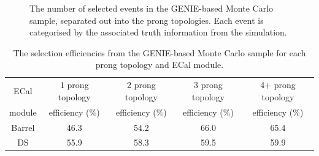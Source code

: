 \begin{figure}
  \centering
  \hspace{1em}
  \caption{The number of selected events in the GENIE-based Monte Carlo sample, separated out into the prong topologies.  Each event is categorised by the associated truth information from the simulation.}
  \label{fig:ProngStackSelectedGENIE}
\end{figure}
\begin{table}
  \begin{tabular}{ c c c c c }
    ECal & 1 prong topology & 2 prong topology & 3 prong topology & 4+ prong topology \\
    module & efficiency ($\%$)& efficiency ($\%$)& efficiency ($\%$)& efficiency ($\%$) \\ \hline \hline
    Barrel & 46.3 & 54.2 & 66.0 & 65.4 \\
    DS & 55.9 & 58.3 & 59.5 & 59.9\\
  \end{tabular}
  \caption{The selection efficiencies from the GENIE-based Monte Carlo sample for each prong topology and ECal module.}
  \label{table:SelEfficiencyGENIE}
\end{table}
